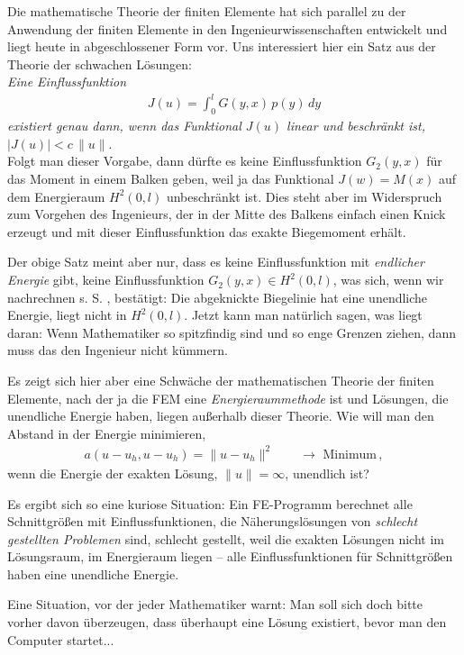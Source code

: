 \begin{remark}
Die mathematische Theorie der finiten Elemente hat sich parallel zu der Anwendung der finiten Elemente in den Ingenieurwissenschaften entwickelt und liegt heute in abgeschlossener Form vor.
Uns interessiert hier ein Satz aus der Theorie der schwachen L\"{o}sungen:\\

 {\em Eine Einflussfunktion
\begin{align}
J(u) = \int_{0}^{l}G(y,x)\,p(y)\,dy
\end{align}
existiert genau dann, wenn das Funktional $J(u)$ linear und beschr\"{a}nkt ist, $|J(u)| < c\,\|u\|$\/}.\\


Folgt man dieser Vorgabe, dann d\"{u}rfte es keine Einflussfunktion $G_2(y,x)$ f\"{u}r das Moment in einem Balken geben, weil ja das Funktional $J(w) = M(x)$ auf dem Energieraum $H^2(0,l)$ unbeschr\"{a}nkt ist. Dies steht aber im Widerspruch zum Vorgehen des Ingenieurs, der in der Mitte des Balkens einfach einen Knick erzeugt und mit dieser Einflussfunktion das exakte Biegemoment erh\"{a}lt.

Der obige Satz meint aber nur, dass es keine Einflussfunktion mit {\em endlicher Energie\/} gibt, keine Einflussfunktion $G_2(y,x) \in H^2(0,l)$, was sich, wenn wir nachrechnen s. S. \pageref{Fourierreihe}, best\"{a}tigt: Die abgeknickte Biegelinie hat eine unendliche Energie, liegt nicht in $H^2(0,l)$. Jetzt kann man nat\"{u}rlich sagen, was liegt daran: Wenn Mathematiker so spitzfindig sind und so enge Grenzen ziehen, dann muss das den Ingenieur nicht k\"{u}mmern.

Es zeigt sich hier aber eine Schw\"{a}che der mathematischen Theorie der finiten Elemente, nach der ja die FEM eine {\em Energieraummethode\/} ist und L\"{o}sungen, die unendliche Energie haben, liegen au{\ss}erhalb dieser Theorie. Wie will man den Abstand in der Energie minimieren,
\begin{align}
a(u-u_h,u-u_h) = \| u - u_h\|^2 \qquad \rightarrow \,\,\text{Minimum}\,,
\end{align}
wenn die Energie der exakten L\"{o}sung, $\|u\| = \infty$, unendlich ist?

Es ergibt sich so eine kuriose Situation: Ein FE-Programm berechnet alle Schnittgr\"{o}{\ss}en mit Einflussfunktionen, die N\"{a}herungsl\"{o}sungen von {\em schlecht gestellten Problemen\/} sind, schlecht gestellt, weil die exakten L\"{o}sungen nicht im L\"{o}sungsraum, im Energieraum liegen -- alle Einflussfunktionen f\"{u}r Schnittgr\"{o}{\ss}en haben eine unendliche Energie.

Eine Situation, vor der jeder Mathematiker warnt: Man soll sich doch bitte vorher davon \"{u}berzeugen, dass \"{u}berhaupt eine L\"{o}sung existiert, bevor man den Computer startet...
\end{remark}
